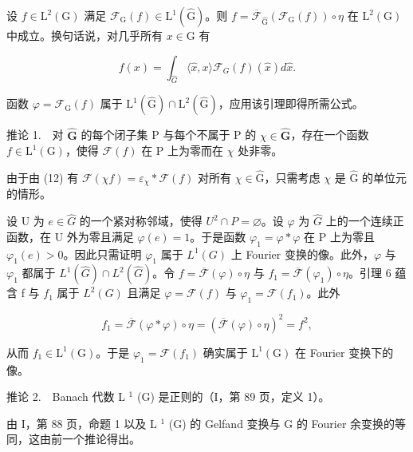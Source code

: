 设 \(f \in \mathrm{L}^2(\mathrm{G})\) 满足 \(\mathcal{F}_{\mathrm{G}}(f) \in \mathrm{L}^1(\widehat{\mathrm{G}})\)。则 \(f = \overline{\mathcal{F}}_{\widehat{\mathrm{G}}}(\mathcal{F}_{\mathrm{G}}(f)) \circ \eta\) 在 \(\mathrm{L}^2(\mathrm{G})\) 中成立。换句话说，对几乎所有 \(x \in \mathrm{G}\) 有

\[
f (x) = \int_ {\widehat {G}} \langle \widehat {x}, x \rangle \mathcal {F} _ {G} (f) (\widehat {x}) d \widehat {x}.
\]

函数 \(\varphi = \mathcal{F}_{\mathrm{G}}(f)\) 属于 \(\mathrm{L}^1 (\widehat{\mathrm{G}})\cap \mathrm{L}^2 (\widehat{\mathrm{G}})\)，应用该引理即得所需公式。

推论 1.　对 \(\widehat{\mathbf{G}}\) 的每个闭子集 P 与每个不属于 P 的 \(\chi \in \widehat{\mathbf{G}}\)，存在一个函数 \(f \in \mathrm{L}^{1}(\mathrm{G})\)，使得 \(\mathcal{F}(f)\) 在 P 上为零而在 \(\chi\) 处非零。

由于由 (12) 有 \(\mathcal{F}(\chi f) = \varepsilon_{\chi} * \mathcal{F}(f)\) 对所有 \(\chi \in \widehat{\mathrm{G}}\)，只需考虑 \(\chi\) 是 \(\widehat{\mathrm{G}}\) 的单位元的情形。

设 U 为 \(e \in \widehat{G}\) 的一个紧对称邻域，使得 \(U^{2} \cap P = \varnothing\)。设 \(\varphi\) 为 \(\widehat{G}\) 上的一个连续正函数，在 U 外为零且满足 \(\varphi(e) = 1\)。于是函数 \(\varphi_{1} = \varphi * \varphi\) 在 P 上为零且 \(\varphi_{1}(e) > 0\)。因此只需证明 \(\varphi_{1}\) 属于 \(L^{1}(G)\) 上 Fourier 变换的像。此外，\(\varphi\) 与 \(\varphi_{1}\) 都属于 \(L^{1}(\widehat{G}) \cap L^{2}(\widehat{G})\)。令 \(f = \overline{\mathcal{F}}(\varphi) \circ \eta\) 与 \(f_{1} = \overline{\mathcal{F}}(\varphi_{1}) \circ \eta\)。引理 6 蕴含 f 与 \(f_{1}\) 属于 \(L^{2}(G)\) 且满足 \(\varphi = \mathcal{F}(f)\) 与 \(\varphi_{1} = \mathcal{F}(f_{1})\)。此外

\[
f _ {1} = \overline {{\mathcal {F}}} (\varphi * \varphi) \circ \eta = (\overline {{\mathcal {F}}} (\varphi) \circ \eta) ^ {2} = f ^ {2},
\]

从而 \(f_{1} \in \mathrm{L}^{1}(\mathrm{G})\)。于是 \(\varphi_{1} = \mathcal{F}(f_{1})\) 确实属于 \(\mathrm{L}^{1}(\mathrm{G})\) 在 Fourier 变换下的像。

推论 2.　Banach 代数 L \(^{1}\) (G) 是正则的（I，第 89 页，定义 1）。

由 I，第 88 页，命题 1 以及 L \(^{1}\) (G) 的 Gelfand 变换与 G 的 Fourier 余变换的等同，这由前一个推论得出。
\relax{}
